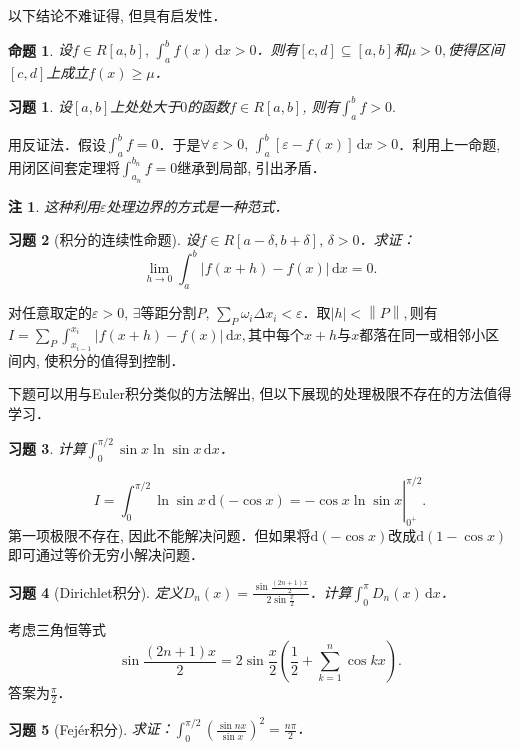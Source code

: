 \documentclass[11pt,a4paper]{ctexart}
\makeatletter
\theoremstyle{thmseries} %
\newtheorem{prop}{命题}[section]
\theoremstyle{exerseries}
\newtheorem{exer}{习题}[section]
\newtheorem*{rem}{注}
\renewenvironment{proof}[1][\proofname]{\par
  \pushQED{\qed}%
  \normalfont \topsep6\p@\@plus6\p@\relax
  \trivlist
  \item[\hskip\labelsep
        \itshape
    #1\@addpunct{}]\ignorespaces
}{%
  \popQED\endtrivlist\@endpefalse
}
\newenvironment{sol}{\begin{proof}[\bfseries\upshape 解\quad]}{\end{proof}}
\newenvironment{pf}{\begin{proof}[\bfseries\upshape 证\quad]}{\end{proof}}
\newcommand{\bra}[1]{\mathopen{}\left(#1\right)}
\renewcommand{\epsilon}{\varepsilon}
\renewcommand{\d}{\mathrm{d}}
\newcommand{\norm}[1]{\left\lVert #1 \right\rVert}
\makeatother
\begin{document}
以下结论不难证得, 但具有启发性．
\begin{prop}
	设$f\in R[a,b],\,\int_{a}^{b}f(x)\,\d x>0$．则有$[c,d]\subseteq[a,b]$和$\mu>0,$使得区间$[c,d]$上成立$f(x)\geq\mu$．
\end{prop}

\begin{exer}
	设$[a,b]$上处处大于$0$的函数$f\in R[a,b]$, 则有$\int_{a}^{b}f>0.$
\end{exer}
\begin{pf}
	用反证法．假设$\int_{a}^{b}f=0$．于是$\forall\,\epsilon>0,\,\int_{a}^{b}[\epsilon-f(x)]\,\d x>0$．利用上一命题, 用闭区间套定理将$\int_{a_n}^{b_n}f=0$继承到局部, 引出矛盾．
\end{pf}
\begin{rem}
	这种利用$\epsilon$处理边界的方式是一种范式．
\end{rem}

\begin{exer}[积分的连续性命题]
	设$f\in R[a-\delta,b+\delta],\,\delta>0$．求证：
	\[\lim_{h\to0}\int_{a}^{b}|f(x+h)-f(x)|\,\d x=0.\]
\end{exer}
\begin{pf}
	对任意取定的$\epsilon>0,\,\exists$等距分割$P,\,\sum_{P}\omega_i\Delta x_i<\epsilon$．取$|h|<\norm{P},$则有
	$I=\sum_{P}\int_{x_{i-1}}^{x_i}|f(x+h)-f(x)|\,\d x,$其中每个$x+h$与$x$都落在同一或相邻小区间内, 使积分的值得到控制．
\end{pf}

下题可以用与Euler积分类似的方法解出, 但以下展现的处理极限不存在的方法值得学习．
\begin{exer}
	计算$\int_{0}^{\pi/2}\sin x\ln\sin x\,\d x$．
\end{exer}
\begin{sol}
	\[\left.I=\int_{0}^{\pi/2}\ln\sin x\,\d(-\cos x)=-\cos x\ln\sin x\right|_{0^+}^{\pi/2}.\]
	第一项极限不存在, 因此不能解决问题．但如果将$\d(-\cos x)$改成$\d(1-\cos x)$即可通过等价无穷小解决问题．
\end{sol}

\begin{exer}[Dirichlet积分]
	定义$D_n(x)=\frac{\sin\frac{(2n+1)x}{2}}{2\sin\frac{x}{2}}$．计算$\int_{0}^{\pi}D_n(x)\,\d x$．
\end{exer}
\begin{sol}
	考虑三角恒等式
	\[\sin\frac{(2n+1)x}{2}=2\sin\frac{x}{2}\bra{\frac{1}{2}+\sum_{k=1}^{n}\cos kx}.\]
	答案为$\frac{\pi}{2}$．
\end{sol}

\begin{exer}[Fejér积分]
	求证：$\int_{0}^{\pi/2}\bra{\frac{\sin nx}{\sin x}}^2=\frac{n\pi}{2}$．
\end{exer}
\end{document}
